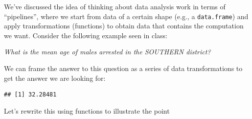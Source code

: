 \documentclass[12pt,]{book}
\newenvironment{Shaded}{\begin{snugshade}}{\end{snugshade}}
\newcommand{\KeywordTok}[1]{\textcolor[rgb]{0.13,0.29,0.53}{\textbf{#1}}}
\newcommand{\DataTypeTok}[1]{\textcolor[rgb]{0.13,0.29,0.53}{#1}}
\newcommand{\StringTok}[1]{\textcolor[rgb]{0.31,0.60,0.02}{#1}}
\newcommand{\CommentTok}[1]{\textcolor[rgb]{0.56,0.35,0.01}{\textit{#1}}}
\newcommand{\OtherTok}[1]{\textcolor[rgb]{0.56,0.35,0.01}{#1}}
\newcommand{\ControlFlowTok}[1]{\textcolor[rgb]{0.13,0.29,0.53}{\textbf{#1}}}
\newcommand{\OperatorTok}[1]{\textcolor[rgb]{0.81,0.36,0.00}{\textbf{#1}}}
\newcommand{\NormalTok}[1]{#1}
\theoremstyle{definition}
\theoremstyle{definition}
\theoremstyle{definition}
\theoremstyle{remark}
\begin{document}
We've discussed the idea of thinking about data analysis work in terms
of ``pipelines'', where we start from data of a certain shape (e.g., a
\texttt{data.frame}) and apply transformations (functions) to obtain
data that contains the computation we want. Consider the following
example seen in class:

\emph{What is the mean age of males arrested in the SOUTHERN district?}

We can frame the answer to this question as a series of data
transformations to get the answer we are looking for:

\begin{Shaded}
\end{Shaded}

\begin{verbatim}
## [1] 32.28481
\end{verbatim}

Let's rewrite this using functions to illustrate the point

\begin{Shaded}
\end{Shaded}
\end{document}
